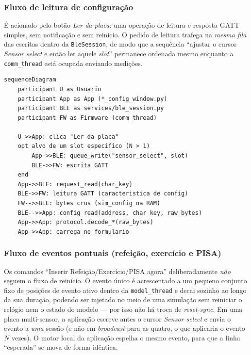\subsubsection{Fluxo de leitura de configuração}
\label{sec:fluxo-leitura}

É acionado pelo botão \emph{Ler da placa}: uma operação de leitura e resposta
GATT simples, sem notificação e sem reinício. O pedido de leitura trafega na
\emph{mesma fila} das escritas dentro da \texttt{BleSession}, de modo que a
sequência ``ajustar o cursor \textit{Sensor select} e então ler aquele
\textit{slot}'' permanece ordenada mesmo enquanto a \texttt{comm\_thread}
está ocupada enviando medições.

\begin{lstlisting}[language=mermaid,caption={Fluxo de leitura de configuração (leitura/resposta GATT, sem reinício).},label={lst:fluxo-leitura}]
sequenceDiagram
    participant U as Usuario
    participant App as App (*_config_window.py)
    participant BLE as services/ble_session.py
    participant FW as Firmware (comm_thread)

    U->>App: clica "Ler da placa"
    opt alvo de um slot especifico (N > 1)
        App->>BLE: queue_write("sensor_select", slot)
        BLE->>FW: escrita GATT
    end
    App->>BLE: request_read(char_key)
    BLE->>FW: leitura GATT (caracteristica de config)
    FW-->>BLE: bytes crus (sim_config na RAM)
    BLE-->>App: config_read(address, char_key, raw_bytes)
    App->>App: protocol.decode_*(raw_bytes)
    App->>App: carrega no formulario
\end{lstlisting}

\subsubsection{Fluxo de eventos pontuais (refeição, exercício e PISA)}
\label{sec:fluxo-pontual}

Os comandos ``Inserir Refeição/Exercício/PISA agora'' deliberadamente
\emph{não} seguem o fluxo de reinício. O evento único é acrescentado a um
pequeno conjunto fixo de posições de evento ativo dentro da
\texttt{model\_thread} e decai sozinho ao longo da sua duração, podendo ser
injetado no meio de uma simulação sem reiniciar o relógio nem o estado do
modelo --- por isso não há troca de \textit{reset-sync}. Em uma placa
multi-sensor, a aplicação escreve antes o cursor \textit{Sensor select} e
envia o evento a \emph{uma} sessão (e não em \textit{broadcast} para as
quatro, o que aplicaria o evento $N$ vezes). O motor local da aplicação
espelha o mesmo evento, para que a linha ``esperada'' se mova de forma
idêntica.


